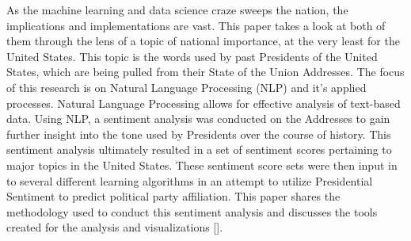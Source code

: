 As the machine learning and data science craze sweeps the nation, the implications and implementations are vast.
This paper takes a look at both of them through the lens of a topic of national importance, at the very least for the United States.
This topic is the words used by past Presidents of the United States, which are being pulled from their State of the Union Addresses.
The focus of this research is on Natural Language Processing (NLP) and it's applied processes.
Natural Language Processing allows for effective analysis of text-based data.
Using NLP, a sentiment analysis was conducted on the Addresses to gain further insight into the tone used by Presidents over the course of history.
This sentiment analysis ultimately resulted in a set of sentiment scores pertaining to major topics in the United States.
These sentiment score sets were then input in to several different learning algorithms in an attempt to utilize Presidential Sentiment to predict political party affiliation.
This paper shares the methodology used to conduct this sentiment analysis and discusses the tools created for the analysis and visualizations [\cite{visuals}].